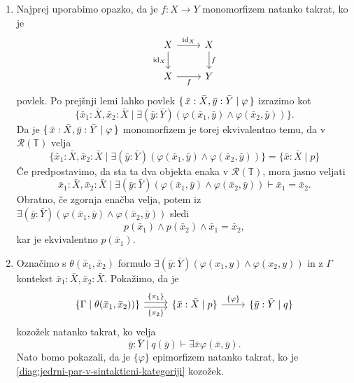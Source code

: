 \documentclass[../kategoricna_logika.tex]{subfiles}
\begin{document}
  \begin{dokaz}
    \begin{enumerate}[label=(\roman*)]
    \item Najprej uporabimo opazko, da je $f : X \to Y$
      monomorfizem natanko takrat, ko je
      \begin{equation*}
        \begin{tikzcd}
          X \ar[d, " \mathrm{id}_X"'] \ar[r, " \mathrm{id}_X"] & X \ar[d, "f"] \\
          X \ar[r, "f"'] & Y
        \end{tikzcd}
      \end{equation*}
      povlek. Po prejšnji lemi lahko povlek $\lbrace\,\bar{x}:\bar{X},\bar{y}:\bar{Y} \mid \varphi\,\rbrace$
      izrazimo kot
      \[ \{ \bar{x}_{1}:\bar{X} ,\bar{x}_{2}:\bar{X}  \mid \exists (\bar{y}:\bar{Y})(\varphi(\bar{x}_1,\bar{y}) \land
        \varphi(\bar{x}_2,\bar{y})) \}.\]
      Da je $\lbrace\,\bar{x}:\bar{X},\bar{y}:\bar{Y} \mid \varphi\,\rbrace$
      monomorfizem je
      torej ekvivalentno temu, da v $\mathcal{R}(\mathbb{T})$ velja
      \[ \{ \bar{x}_{1}:\bar{X} ,\bar{x}_{2}:\bar{X}  \mid \exists (\bar{y}:\bar{Y})(\varphi(\bar{x}_1,\bar{y}) \land
        \varphi(\bar{x}_2,\bar{y})) \} = \{\bar{x}:\bar{X} \mid p\} \]
      Če predpostavimo, da sta
      ta dva objekta enaka v $\mathcal{R}(\mathbb{T})$, mora jasno
      veljati
    $$\bar{x}_1:\bar{X},\bar{x}_2:\bar{X} \mid \exists (\bar{y}:\bar{Y}) \left( \varphi(\bar{x}_1,\bar{y}) \wedge \varphi(\bar{x}_2,\bar{y}) \right) \vdash \bar{x}_1 = \bar{x}_2.$$
    Obratno, če zgornja enačba velja, potem iz
    $\exists (\bar{y}:\bar{Y})(\varphi(\bar{x}_1,\bar{y}) \land \varphi(\bar{x}_2,\bar{y}))$ sledi
    \[p(\bar{x}_1) \land p(\bar{x}_2) \land \bar{x}_1 = \bar{x}_2,\] kar je ekvivalentno
    $p(\bar{x}_1)$.

  \item Označimo s $\theta(\bar{x}_{1},\bar{x}_2)$ formulo
    $\exists (\bar{y}:\bar{Y})(\varphi(x_1,y) \land \varphi(x_2,y))$ in z $\Gamma$ kontekst
    $\bar{x}_1:\bar{X},\bar{x}_2:\bar{X}$.
    Pokažimo, da je
    \begin{equation}\label{diag:jedrni-par-v-sintakticni-kategoriji}
      \begin{tikzcd}
        \{ \Gamma \mid \theta(\bar{x}_1,\bar{x}_2))
        \} \ar[r, shift left, "{\{\pi_1\}}"]
        \ar[r, shift right, "{\{\pi_2\}}"'] &
        \{\bar{x}:\bar{X}  \mid p\} \ar[r, "{\{\varphi \}}"] &
        \{\bar{y}:\bar{Y} \mid q\}
      \end{tikzcd}
    \end{equation}
    kozožek natanko takrat, ko velja
    $$\bar{y}:\bar{Y} \mid q(\bar{y}) \vdash \exists \bar{x} \varphi(\bar{x},\bar{y}).$$
    Nato bomo pokazali, da je $\{\varphi \}$ epimorfizem natanko
    takrat, ko je \eqref{diag:jedrni-par-v-sintakticni-kategoriji}
    kozožek.



\end{enumerate}
\end{dokaz}
\end{document}
